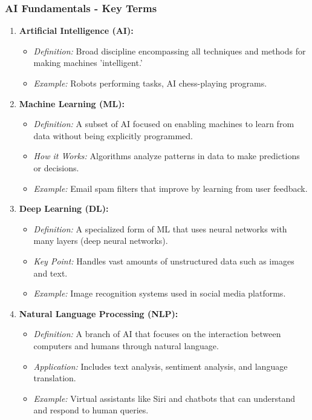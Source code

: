 \documentclass{beamer}
\begin{document}
\begin{frame}[fragile]
    \frametitle{AI Fundamentals - Key Terms}
    \begin{enumerate}
        \item \textbf{Artificial Intelligence (AI):} 
            \begin{itemize}
                \item \textit{Definition:} Broad discipline encompassing all techniques and methods for making machines 'intelligent.'
                \item \textit{Example:} Robots performing tasks, AI chess-playing programs.
            \end{itemize}
        
        \item \textbf{Machine Learning (ML):}
            \begin{itemize}
                \item \textit{Definition:} A subset of AI focused on enabling machines to learn from data without being explicitly programmed.
                \item \textit{How it Works:} Algorithms analyze patterns in data to make predictions or decisions.
                \item \textit{Example:} Email spam filters that improve by learning from user feedback.
            \end{itemize}
        
        \item \textbf{Deep Learning (DL):}
            \begin{itemize}
                \item \textit{Definition:} A specialized form of ML that uses neural networks with many layers (deep neural networks).
                \item \textit{Key Point:} Handles vast amounts of unstructured data such as images and text.
                \item \textit{Example:} Image recognition systems used in social media platforms.
            \end{itemize}
        
        \item \textbf{Natural Language Processing (NLP):}
            \begin{itemize}
                \item \textit{Definition:} A branch of AI that focuses on the interaction between computers and humans through natural language.
                \item \textit{Application:} Includes text analysis, sentiment analysis, and language translation.
                \item \textit{Example:} Virtual assistants like Siri and chatbots that can understand and respond to human queries.
            \end{itemize}
    \end{enumerate}
\end{frame}
\end{document}
